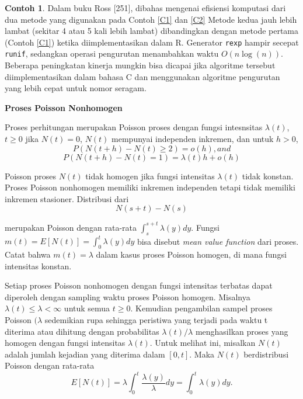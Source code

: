 \documentclass[a4paper,12pt]{article}
\theoremstyle{definition}
\newtheorem{example}{Contoh}[section]
\begin{document}
\begin{example}
Dalam buku Ross [251], dibahas mengenai efisiensi komputasi dari dua metode yang digunakan pada Contoh \ref{C1} dan \ref{C2} Metode kedua jauh lebih lambat (sekitar 4 atau 5 kali lebih lambat) dibandingkan dengan metode pertama (Contoh \ref{C1}) ketika diimplementasikan dalam R. Generator \texttt{rexp} hampir secepat \texttt{runif}, sedangkan operasi pengurutan menambahkan waktu $O(n \log (n))$. Beberapa peningkatan kinerja mungkin bisa dicapai jika algoritme tersebut diimplementasikan dalam bahasa C dan menggunakan algoritme pengurutan yang lebih cepat untuk nomor seragam.
\end{example}   

\textbf{Proses Poisson Nonhomogen}

Proses perhitungan merupakan Poisson proses dengan fungsi intesnsitas $\lambda (t)$, $t \geq 0$ jika $N(t) = 0$, $N(t)$ mempunyai independen inkremen, dan untuk $h > 0$,
    \begin{equation*}
        P(N(t + h) - N(t) \geq 2) = o(h), {and}
    \end{equation*}
    \begin{equation*}
        P(N(t + h) - N(t) = 1) = \lambda (t)h + o(h)
    \end{equation*}
    
Poisson proses $N(t)$ tidak homogen jika fungsi intensitas $\lambda (t)$ tidak konstan. Proses Poisson nonhomogen memiliki inkremen independen tetapi tidak memiliki inkremen stasioner. Distribusi dari 
    \begin{equation*}
        N(s +t) - N(s)
    \end{equation*}

merupakan Poisson dengan rata-rata $\int_{s}^{s+t} \lambda (y) dy$. Fungsi $m (t) = E[N(t)] = \int_{0}^{t} \lambda (y) dy$ bisa disebut \textit{mean value function} dari proses. Catat bahwa $m(t) = \lambda$ dalam kasus proses Poisson homogen, di mana fungsi intensitas konstan.

Setiap proses Poisson nonhomogen dengan fungsi intensitas terbatas dapat diperoleh dengan sampling waktu proses Poisson homogen. Misalnya  $\lambda(t) \leq \lambda < \infty$ untuk semua $t \geq 0$. Kemudian pengambilan sampel proses Poisson $(\lambda$ sedemikian rupa sehingga peristiwa yang terjadi pada waktu t diterima atau dihitung dengan probabilitas $\lambda (t)/\lambda$ menghasilkan proses yang homogen dengan fungsi intensitas $\lambda (t)$. Untuk melihat ini, misalkan $N(t)$ adalah jumlah kejadian yang diterima dalam $[0, t]$. Maka $N(t)$ berdistribusi Poisson dengan rata-rata
    \begin{equation*}
        E[N(t)] = \lambda \int_{0}^{t} \frac{\lambda (y)}{\lambda} dy = \int_{0}^{t} \lambda (y) dy.
    \end{equation*}
\end{document}
